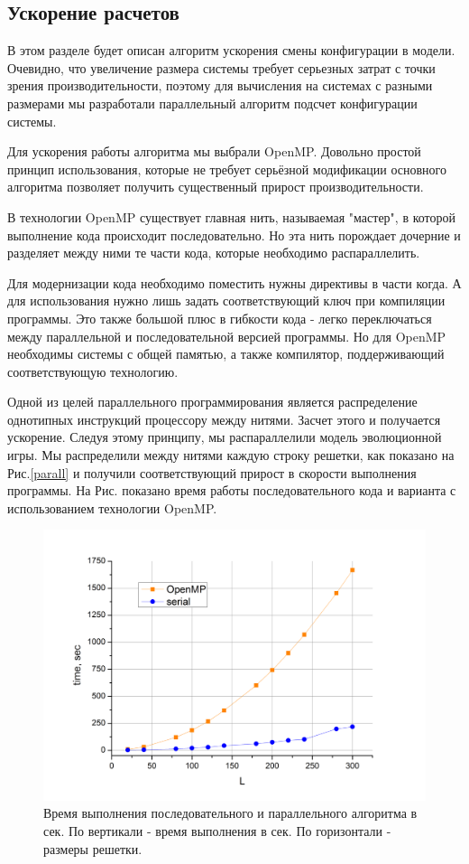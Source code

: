 \documentclass[12pt,a4paper]{article}
\begin{document}
	\subsection{Ускорение расчетов}
	
	\par В этом разделе будет описан алгоритм ускорения смены конфигурации в модели. Очевидно, что увеличение размера системы требует серьезных затрат с точки зрения производительности, поэтому для вычисления на системах с разными размерами мы разработали параллельный алгоритм подсчет конфигурации системы.
	
	\par Для ускорения работы алгоритма мы выбрали OpenMP\cite{OpenMP}. Довольно простой принцип использования, которые не требует серьёзной модификации основного алгоритма позволяет получить существенный прирост производительности.
	
	\par В технологии OpenMP существует главная нить, называемая "мастер", в которой выполнение кода происходит последовательно. Но эта нить порождает дочерние и разделяет между ними те части кода, которые необходимо распараллелить. 
	
	\par Для модернизации кода необходимо поместить нужны директивы в части когда. А для использования нужно лишь задать соответствующий ключ при компиляции программы. Это также большой плюс в гибкости кода - легко переключаться между параллельной и последовательной версией программы. Но для OpenMP необходимы системы с общей памятью, а также компилятор, поддерживающий соответствующую технологию.
	
	\par Одной из целей параллельного программирования является распределение однотипных инструкций процессору между нитями. Засчет этого и получается ускорение. Следуя этому принципу, мы распараллелили модель эволюционной игры. Мы распределили между нитями каждую строку решетки, как показано на Рис.\ref{parall} и получили соответствующий прирост в скорости выполнения программы. На Рис. показано время работы последовательного кода и варианта с использованием технологии OpenMP.
	
	\begin{figure}
		\label{time}
		\centering
		\includegraphics[width=0.7\linewidth]{time.png}
		\caption{Время выполнения последовательного и параллельного алгоритма в сек. По вертикали - время выполнения в сек. По горизонтали - размеры решетки.}
	\end{figure}
	
\end{document}
